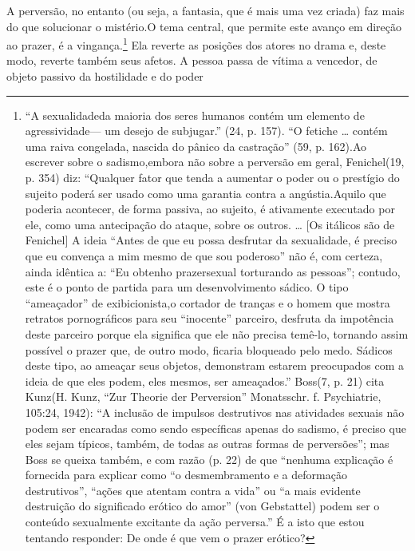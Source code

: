 A perversão, no entanto (ou seja, a fantasia, que é mais uma vez
criada) faz mais do que solucionar o mistério.\idxfanta[|)] O tema central, que
permite este avanço em direção ao prazer,\idxvinga{} é a vingança.\footnote{ ``A sexualidade\idxsexuateo[|nn] da maioria dos seres humanos
contém um elemento de agressividade\idxagres[|nn] --- um desejo de
subjugar.'' (24, p. 157). ``O fetiche \ldots{}
contém uma raiva congelada, nascida do pânico da
castração'' (59, p. 162).\idxfreudsexua[|nn] Ao escrever sobre o sadismo,\idxsadiangu[|nn]
embora não sobre a perversão em geral, Fenichel\idxfenic[|nn] (19, p. 354) diz:
``Qualquer fator que tenda a aumentar o poder ou o
prestígio do sujeito poderá ser usado como uma garantia contra a
angústia.\idxangu[|nn] Aquilo que poderia acontecer, de forma passiva, ao sujeito, é
ativamente executado por ele, como uma antecipação do ataque, sobre os
outros. \ldots{} [Os itálicos são de Fenichel] A ideia
``Antes de que eu possa desfrutar da sexualidade, é
preciso que eu convença a mim mesmo de que sou
poderoso'' não é, com certeza, ainda idêntica a:
``Eu obtenho prazer\idxpraz[|nn] sexual torturando as
pessoas''; contudo, este é o ponto de partida para um
desenvolvimento sádico. O tipo
``ameaçador'' de exibicionista,\idxexibi[|nn] o
cortador de tranças e o homem que mostra retratos pornográficos para
seu ``inocente'' parceiro, desfruta da
impotência deste parceiro porque ela significa que ele não precisa
temê-lo, tornando assim possível o prazer que, de outro modo, ficaria
bloqueado pelo medo. Sádicos deste tipo, ao ameaçar seus objetos,
demonstram estarem preocupados com a ideia de que eles podem, eles
mesmos, ser ameaçados.'' Boss\idxboss[|nn] (7, p. 21) cita Kunz\idxkunz[|nn] (H. Kunz,
``Zur Theorie der Perversion'' Monatsschr. f. Psychiatrie, 105:24, 1942):
``A inclusão de impulsos destrutivos nas atividades sexuais não podem
ser encaradas como sendo específicas apenas do sadismo, é preciso que eles
sejam típicos, também, de todas as outras formas de perversões''; mas
Boss se queixa também, e com razão (p. 22) de que ``nenhuma explicação
é fornecida para explicar como ``o desmembramento e a deformação destrutivos'',
``ações que atentam contra a vida'' ou ``a mais evidente destruição do
significado erótico do amor'' (von Gebstattel) podem ser o conteúdo
sexualmente excitante da ação perversa.'' É a isto que estou tentando responder:
De onde é que vem o prazer erótico?} Ela reverte as posições dos
atores no drama e, deste modo, reverte também seus afetos. A pessoa
passa de vítima a vencedor, de objeto passivo da hostilidade e do poder
